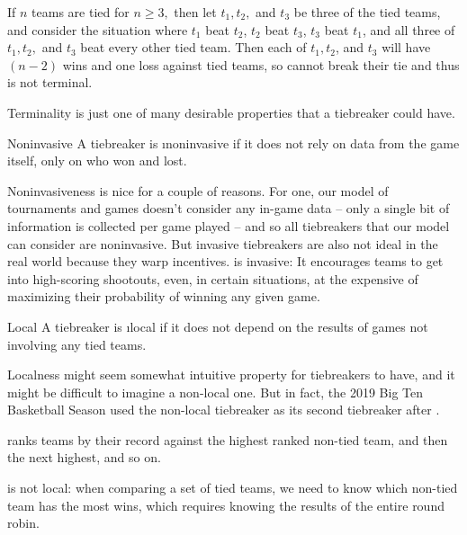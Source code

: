 {{        If $n$ teams are tied for $n \geq 3,$ then let $t_1, t_2,$ and $t_3$ be three of the tied teams, and consider the situation where $t_1$ beat $t_2$, $t_2$ beat $t_3$, $t_3$ beat $t_1$, and all three of $t_1, t_2,$ and $t_3$ beat every other tied team. Then each of $t_1, t_2$, and $t_3$ will have $(n-2)$ wins and one loss against tied teams, so  cannot break their tie and thus is not terminal.
    }{}

    Terminality is just one of many desirable properties that a tiebreaker could have.

    \begin{definition}{Noninvasive}{}
        A tiebreaker is \i{noninvasive} if it does not rely on data from the game itself, only on who won and lost.
    \end{definition}

    Noninvasiveness is nice for a couple of reasons. For one, our model of tournaments and games doesn't consider any in-game data -- only a single bit of information is collected per game played -- and so all tiebreakers that our model can consider are noninvasive. But invasive tiebreakers are also not ideal in the real world because they warp incentives.  is invasive: It encourages teams to get into high-scoring shootouts, even, in certain situations, at the expensive of maximizing their probability of winning any given game.

    \begin{definition}{Local}{}
        A tiebreaker is \i{local} if it does not depend on the results of games not involving any tied teams.
    \end{definition}

    Localness might seem somewhat intuitive property for tiebreakers to have, and it might be difficult to imagine a non-local one. But in fact, the 2019 Big Ten Basketball Season used the non-local tiebreaker  as its second tiebreaker after .

    \begin{definition}{}{}
         ranks teams by their record against the highest ranked non-tied team, and then the next highest, and so on.
    \end{definition}

     is not local: when comparing a set of tied teams, we need to know which non-tied team has the most wins, which requires knowing the results of the entire round robin.

}

